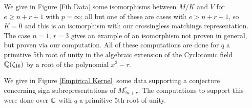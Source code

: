 \documentclass{amsart}
\begin{document}
We give in Figure \ref{Fib Data} some isomorphisms between $M/K$ and $V$ for $e \geq n + r + 1$ with $p = \infty$;
all but one of these are cases with $e > n + r + 1$, so $K=0$ and this is an isomorphism with our crossingless matchings representation.
The case $n = 1$, $r = 3$ gives an example of an isomorphism not proven in general, but proven via our computation.
All of these computations are done for $q$ a primitive 5th root of unity in the algebraic extension of the Cyclotomic field $\mathbb{Q}(\zeta_{10})$ by a root of the polynomial $x^2 - \tau$.

We give in Figure \ref{Empirical Kernel} some data supporting a conjecture concerning sign subrepresentations of $M_{2n + r}^r$.
The computations to support this were done over $\mathbb{C}$ with $q$ a primitive 5th root of unity.

\begin{figure}
\iffalse
\def\tho{\Phi_3(q^{1/2})}
\def\tht{\brk{3}_{q^{1/2}}}
\def\to{q^{1/2}\brk{2}_{q^{1/2}}}
Define the following coefficients:
\begin{align*}
  \tho &:= q^{3/2} + 1\\
  \tht &:= q^{3/2} + q + q^{1/2} + 1\\
  \to &:= q + q^{1/2}
\end{align*}
\fi


\end{figure}
\end{document}
